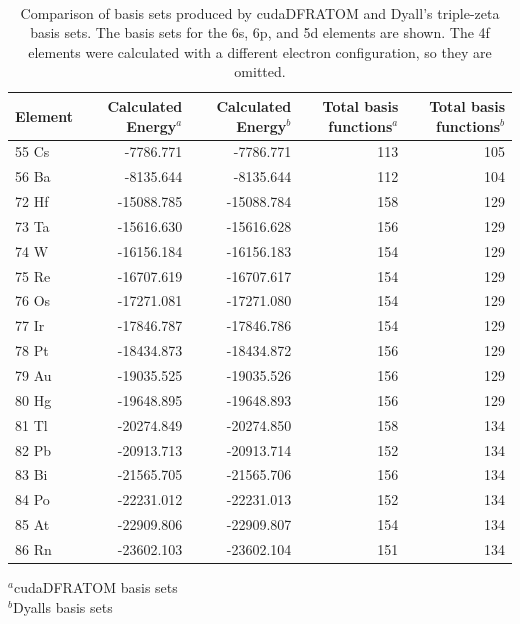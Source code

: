 \begin{table}
\caption[Comparison of basis sets produced by cudaDFRATOM and Dyall's triple-zeta basis sets.]{Comparison of basis sets produced by cudaDFRATOM and Dyall's triple-zeta basis sets. The basis sets for the 6s, 6p, and 5d elements are shown. The 4f elements were calculated with a different electron configuration, so they are omitted.} 
\label{tab:dyall_comp} \\
\begin{tabular}{l r r r r}
\toprule
  Element	  &	Calculated Energy$^{a}$ & Calculated Energy$^{b}$ & Total basis functions$^{a}$ & Total basis functions$^{b}$ 	      \\
\midrule
55 Cs &	-7786.771            &  -7786.771              & 113                         & 105  \\
56 Ba &	-8135.644            &  -8135.644              & 112                         & 104  \\
72 Hf &	-15088.785            & -15088.784              & 158                         & 129   \\
73 Ta &   -15616.630            & -15616.628              & 156                         & 129   \\
74 W &   -16156.184            & -16156.183              & 154                         & 129   \\
75 Re &   -16707.619            & -16707.617              & 154                         & 129   \\
76 Os &   -17271.081            & -17271.080              & 154                         & 129   \\
77 Ir &   -17846.787            & -17846.786              & 154                         & 129   \\
78 Pt	 &   -18434.873            & -18434.872              & 156                         & 129   \\
79 Au &   -19035.525            & -19035.526              & 156                         & 129   \\
80 Hg &   -19648.895            & -19648.893              & 156                         & 129   \\
81 Tl &   -20274.849            & -20274.850              & 158                         & 134   \\
82 Pb &   -20913.713            & -20913.714              & 152                         & 134   \\
83 Bi &   -21565.705            & -21565.706              & 156                         & 134   \\
84 Po &   -22231.012            & -22231.013              & 152                         & 134   \\
85 At &   -22909.806            & -22909.807              & 154                         & 134   \\
86 Rn &   -23602.103            & -23602.104              & 151                         & 134   \\
\bottomrule
\end{tabular}
  $^{a}$cudaDFRATOM basis sets	\\
  $^{b}$Dyalls basis sets
\end{table}

